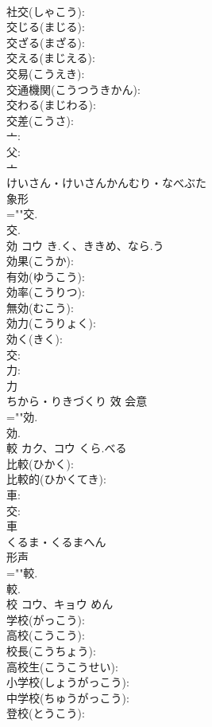 \documentclass[8pt]{extreport}
\begin{document}
\begin{CJK}{UTF8}{min}
\\	社交(しゃこう): 
\\	交じる(まじる): 
\\	交ざる(まざる): 
\\	交える(まじえる): 
\\	交易(こうえき): 
\\	交通機関(こうつうきかん): 
\\	交わる(まじわる): 
\\	交差(こうさ): 
\\	亠: 
\\	父: 
\\	亠	
\\	けいさん・けいさんかんむり・なべぶた	
\\	象形 
\\	=""交.
\\	交.
\\	効	コウ	き.く、ききめ、なら.う		
\\	効果(こうか): 
\\	有効(ゆうこう): 
\\	効率(こうりつ): 
\\	無効(むこう): 
\\	効力(こうりょく): 
\\	効く(きく): 
\\	交: 
\\	力: 
\\	力	
\\	ちから・りきづくり	效	会意 
\\	=""効.
\\	効.
\\	較	カク、コウ	くら.べる		
\\	比較(ひかく): 
\\	比較的(ひかくてき): 
\\	車: 
\\	交: 
\\	車	
\\	くるま・くるまへん	
\\	形声 
\\	=""較.
\\	較.
\\	校	コウ、キョウ		めん	
\\	学校(がっこう): 
\\	高校(こうこう): 
\\	校長(こうちょう): 
\\	高校生(こうこうせい): 
\\	小学校(しょうがっこう): 
\\	中学校(ちゅうがっこう): 
\\	登校(とうこう): 

\end{CJK}
\end{document}
